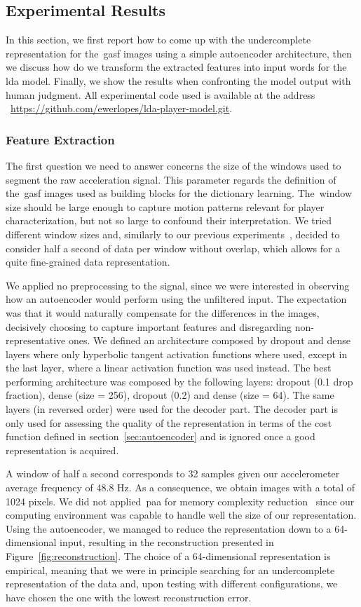 \subsection{Experimental Results}
In this section, we first report how to come up with the undercomplete representation for the~\gls{gasf} images using a simple autoencoder architecture, then we discuss how do we transform the extracted features into input words for the \gls{lda} model. Finally, we show the results when confronting the model output with human judgment. All experimental code used is available at the address ~\url{https://github.com/ewerlopes/lda-player-model.git}.

\subsubsection{Feature Extraction}
The first question we need to answer concerns the size of the windows used to segment the raw acceleration signal. This parameter regards the definition of the~\gls{gasf} images used as building blocks for the dictionary learning. The~window size should be large enough to capture motion patterns relevant for player characterization, but not so large to confound their interpretation. We tried different window sizes and, similarly to our previous experiments~\citep{oliveira_activity_2017}, decided to consider half a second of data per window without overlap, which allows for a quite fine-grained data representation.

We applied no preprocessing to the signal, since we were interested in observing how an autoencoder would perform using the unfiltered input. The expectation was that it would naturally compensate for the differences in the images, decisively choosing to capture important features and disregarding non-representative ones. We defined an architecture composed by dropout and dense layers where only hyperbolic tangent activation functions where used, except in the last layer, where a linear activation function was used instead. The best performing architecture was composed by the following layers: dropout (0.1 drop fraction), dense (size = 256), dropout (0.2) and dense (size = 64). The same layers (in reversed order) were used for the decoder part. The decoder part is only used for assessing the quality of the representation in terms of the cost function defined in section~\ref{sec:autoencoder} and is ignored once a good representation is acquired.

A window of half a second corresponds to 32 samples given our accelerometer average frequency of 48.8 Hz. As a consequence, we obtain images with a total of 1024 pixels. We did not applied~\gls{paa} for memory complexity reduction~\citep{wang_time_2016} since our computing environment was capable to handle well the size of our representation. Using the autoencoder, we managed to reduce the representation down to a 64-dimensional input, resulting in the reconstruction presented in Figure~\ref{fig:reconstruction}. The choice of a 64-dimensional representation is empirical, meaning that we were in principle searching for an undercomplete representation of the data and, upon testing with different configurations, we have chosen the one with the lowest reconstruction error.  


